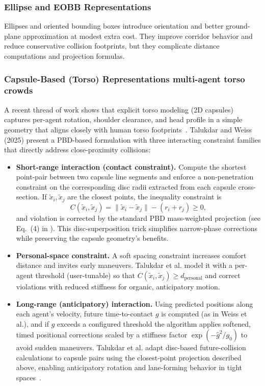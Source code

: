\subsubsection{Ellipse and EOBB Representations}
Ellipses and oriented bounding boxes introduce orientation and better ground-plane approximation at modest extra cost. They improve corridor behavior and reduce conservative collision footprints, but they complicate distance computations and projection formulas.

\subsubsection{Capsule-Based (Torso) Representations multi-agent torso crowds}
\label{sec:torso-crowds}
A recent thread of work shows that explicit torso modeling (2D capsules) captures per-agent rotation, shoulder clearance, and head profile in a simple geometry that aligns closely with human torso footprints~\cite{talukdar2025,stuevel2017}. Talukdar and Weiss (2025) present a PBD-based formulation with three interacting constraint families that directly address close-proximity collisions:

\begin{itemize}
  \item \textbf{Short-range interaction (contact constraint).} Compute the shortest point-pair between two capsule line segments and enforce a non-penetration constraint on the corresponding disc radii extracted from each capsule cross-section. If $\tilde{x}_i,\tilde{x}_j$ are the closest points, the inequality constraint is
  \[
  C(\tilde{x}_i,\tilde{x}_j) = \|\tilde{x}_i - \tilde{x}_j\| - (r_i + r_j) \ge 0,
  \]
  and violation is corrected by the standard PBD mass-weighted projection (see Eq.~(4) in \cite{talukdar2025}). This disc-superposition trick simplifies narrow-phase corrections while preserving the capsule geometry's benefits.
  \item \textbf{Personal-space constraint.} A soft spacing constraint increases comfort distance and invites early maneuvers. Talukdar et al. model it with a per-agent threshold (user-tunable) so that $C(\tilde{x}_i,\tilde{x}_j) \ge d_{\mathrm{personal}}$ and correct violations with reduced stiffness for organic, anticipatory motion.
  \item \textbf{Long-range (anticipatory) interaction.} Using predicted positions along each agent's velocity, future time-to-contact $g$ is computed (as in Weiss et al.), and if $g$ exceeds a configured threshold the algorithm applies softened, timed positional corrections scaled by a stiffness factor $\exp(-\hat{g}^2/g_0)$ to avoid sudden maneuvers. Talukdar et al. adapt disc-based future-collision calculations to capsule pairs using the closest-point projection described above, enabling anticipatory rotation and lane-forming behavior in tight spaces~\cite{talukdar2025}.
\end{itemize}

